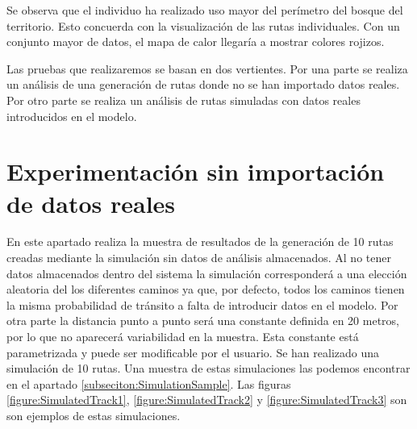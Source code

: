 Se observa que el individuo ha realizado uso mayor del perímetro del bosque del territorio. Esto 
concuerda con la visualización de las rutas individuales. Con un conjunto mayor de datos, el mapa de 
calor llegaría a mostrar colores rojizos.

Las pruebas que realizaremos se basan en dos vertientes. Por una parte se realiza un análisis de una 
generación de rutas donde no se han importado datos reales. Por otro parte se realiza un análisis de 
rutas simuladas con datos reales introducidos en el modelo.


\section{Experimentación sin importación de datos reales}
En este apartado realiza la muestra de resultados de la generación de 10 rutas creadas 
mediante la simulación sin datos de análisis almacenados. Al no tener datos almacenados dentro del 
sistema la simulación corresponderá a una elección aleatoria del los diferentes caminos ya que, por 
defecto, todos los caminos tienen la misma probabilidad de tránsito a falta de introducir datos en el 
modelo. Por otra parte la distancia punto a punto será una constante definida en 20 metros, por lo 
que no aparecerá variabilidad en la muestra. Esta constante está parametrizada y puede ser 
modificable por el usuario.
Se han realizado una simulación de 10 rutas. Una muestra de estas simulaciones las podemos encontrar en el apartado \ref{subseciton:SimulationSample}. Las figuras \ref{figure:SimulatedTrack1}, \ref{figure:SimulatedTrack2} y \ref{figure:SimulatedTrack3} son son ejemplos de estas simulaciones.
